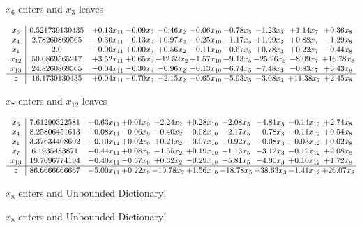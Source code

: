 \documentclass[9pt]{article}
\begin{document}
 $ x_{6} $ enters and $ x_{3} $ leaves 

 \[\begin{array}{c| c c@{\hskip 2pt} c@{\hskip 2pt} c@{\hskip 2pt} c@{\hskip 2pt} c@{\hskip 2pt} c@{\hskip 2pt} c@{\hskip 2pt} c@{\hskip 2pt} }
 x_{6}   &  0.521739130435 & +  0.13 x_{11} & -0.09 x_{9} & -0.46 x_{2} & +  0.06 x_{10} & -0.78 x_{5} & -1.23 x_{3} & +  1.14 x_{7} & +  0.36 x_{8}\\
 x_{4}   &  2.78260869565 & -0.30 x_{11} & -0.13 x_{9} & +  0.97 x_{2} & -0.25 x_{10} & -1.17 x_{5} & +  1.99 x_{3} & +  0.88 x_{7} & -1.29 x_{8}\\
 x_{1}   &  2.0 & -0.00 x_{11} & +  0.00 x_{9} & +  0.56 x_{2} & -0.11 x_{10} & -0.67 x_{5} & +  0.78 x_{3} & +  0.22 x_{7} & -0.44 x_{8}\\
 x_{12}   &  50.0869565217 & +  3.52 x_{11} & +  0.65 x_{9} & -12.52 x_{2} & +  1.57 x_{10} & -9.13 x_{5} & -25.26 x_{3} & -8.09 x_{7} & + 16.78 x_{8}\\
 x_{13}   &  24.8260869565 & -0.04 x_{11} & -0.30 x_{9} & -0.96 x_{2} & -0.13 x_{10} & -6.74 x_{5} & -7.48 x_{3} & -0.83 x_{7} & +  3.43 x_{8}\\
\hline
z    &  16.1739130435 & +  0.04 x_{11} & -0.70 x_{9} & -2.15 x_{2} & -0.65 x_{10} & -5.93 x_{5} & -3.08 x_{3} & + 11.38 x_{7} & +  2.45 x_{8}\\
\end{array}\]


 $ x_{7} $ enters and $ x_{12} $ leaves 

 \[\begin{array}{c| c c@{\hskip 2pt} c@{\hskip 2pt} c@{\hskip 2pt} c@{\hskip 2pt} c@{\hskip 2pt} c@{\hskip 2pt} c@{\hskip 2pt} c@{\hskip 2pt} }
 x_{6}   &  7.61290322581 & +  0.63 x_{11} & +  0.01 x_{9} & -2.24 x_{2} & +  0.28 x_{10} & -2.08 x_{5} & -4.81 x_{3} & -0.14 x_{12} & +  2.74 x_{8}\\
 x_{4}   &  8.25806451613 & +  0.08 x_{11} & -0.06 x_{9} & -0.40 x_{2} & -0.08 x_{10} & -2.17 x_{5} & -0.78 x_{3} & -0.11 x_{12} & +  0.54 x_{8}\\
 x_{1}   &  3.37634408602 & +  0.10 x_{11} & +  0.02 x_{9} & +  0.21 x_{2} & -0.07 x_{10} & -0.92 x_{5} & +  0.08 x_{3} & -0.03 x_{12} & +  0.02 x_{8}\\
 x_{7}   &  6.1935483871 & +  0.44 x_{11} & +  0.08 x_{9} & -1.55 x_{2} & +  0.19 x_{10} & -1.13 x_{5} & -3.12 x_{3} & -0.12 x_{12} & +  2.08 x_{8}\\
 x_{13}   &  19.7096774194 & -0.40 x_{11} & -0.37 x_{9} & +  0.32 x_{2} & -0.29 x_{10} & -5.81 x_{5} & -4.90 x_{3} & +  0.10 x_{12} & +  1.72 x_{8}\\
\hline
z    &  86.6666666667 & +  5.00 x_{11} & +  0.22 x_{9} & -19.78 x_{2} & +  1.56 x_{10} & -18.78 x_{5} & -38.63 x_{3} & -1.41 x_{12} & + 26.07 x_{8}\\
\end{array}\]


 $ x_{8} $ enters and Unbounded Dictionary!


 $ x_{8} $ enters and Unbounded Dictionary!
\end{document}
